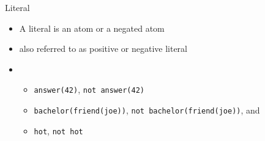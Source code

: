 \begin{frame}{Literal}
  \begin{itemize}
  \item A \alert{literal} is an atom or a negated atom
  \item[] also referred to as positive or negative literal
    \bigskip
  \item {}\small
    \begin{itemize}
    \item \lstinline{answer(42)}, \lstinline{not answer(42)}
    \item \lstinline{bachelor(friend(joe))}, \lstinline{not bachelor(friend(joe))}, and
    \item \lstinline{hot}, \lstinline{not hot}
    \end{itemize}
  \end{itemize}
\end{frame}